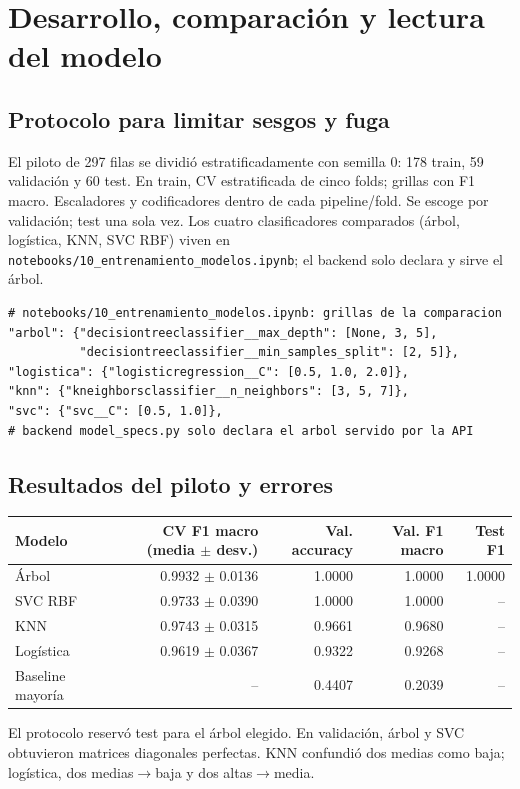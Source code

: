 \documentclass[11pt,a4paper]{article}
\begin{document}
\section{Desarrollo, comparación y lectura del modelo}

\subsection{Protocolo para limitar sesgos y fuga}
El piloto de 297 filas se dividió estratificadamente con semilla 0: 178 train, 59 validación y 60 test. En train, CV estratificada de cinco folds; grillas con F1 macro. Escaladores y codificadores dentro de cada pipeline/fold. Se escoge por validación; test una sola vez. Los cuatro clasificadores comparados (árbol, logística, KNN, SVC RBF) viven en \texttt{notebooks/10\_entrenamiento\_modelos.ipynb}; el backend solo declara y sirve el árbol.

\begin{lstlisting}
# notebooks/10_entrenamiento_modelos.ipynb: grillas de la comparacion
"arbol": {"decisiontreeclassifier__max_depth": [None, 3, 5],
          "decisiontreeclassifier__min_samples_split": [2, 5]},
"logistica": {"logisticregression__C": [0.5, 1.0, 2.0]},
"knn": {"kneighborsclassifier__n_neighbors": [3, 5, 7]},
"svc": {"svc__C": [0.5, 1.0]},
# backend model_specs.py solo declara el arbol servido por la API
\end{lstlisting}

\subsection{Resultados del piloto y errores}
\begin{center}
\small
\begin{tabular}{lrrrr}
\toprule
Modelo & CV F1 macro (media $\pm$ desv.) & Val. accuracy & Val. F1 macro & Test F1 \\
\midrule
Árbol & 0.9932 $\pm$ 0.0136 & 1.0000 & 1.0000 & 1.0000 \\
SVC RBF & 0.9733 $\pm$ 0.0390 & 1.0000 & 1.0000 & -- \\
KNN & 0.9743 $\pm$ 0.0315 & 0.9661 & 0.9680 & -- \\
Logística & 0.9619 $\pm$ 0.0367 & 0.9322 & 0.9268 & -- \\
Baseline mayoría & -- & 0.4407 & 0.2039 & -- \\
\bottomrule
\end{tabular}
\end{center}
El protocolo reservó test para el árbol elegido. En validación, árbol y SVC obtuvieron matrices diagonales perfectas. KNN confundió dos medias como baja; logística, dos medias$\rightarrow$baja y dos altas$\rightarrow$media.
\end{document}
